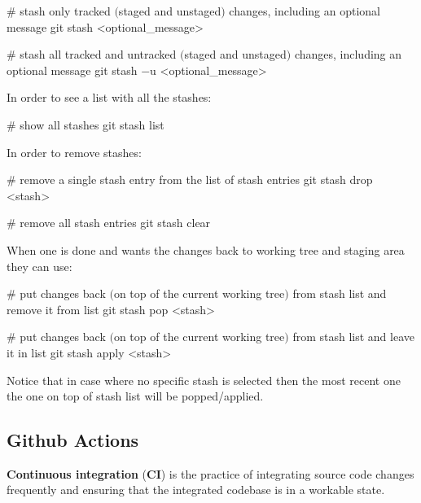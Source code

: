 \begin{bash}
# stash only tracked $($staged and unstaged$)$ changes, including an optional message
git stash <optional_message>
\end{bash}

\begin{bash}
# stash all tracked and untracked $($staged and unstaged$)$ changes, including an optional message
git stash $-$u <optional_message>
\end{bash}

In order to see a list with all the stashes:

\begin{bash}
# show all stashes
git stash list
\end{bash}

In order to remove stashes:

\begin{bash}
# remove a single stash entry from the list of stash entries
git stash drop <stash>
\end{bash}

\begin{bash}
# remove all stash entries
git stash clear
\end{bash}

When one is done and wants the changes back to working tree and staging area they can use:

\begin{bash}
# put changes back $($on top of the current working tree$)$ from stash list and remove it from list
git stash pop <stash>
\end{bash}

\begin{bash}
# put changes back $($on top of the current working tree$)$ from stash list and leave it in list
git stash apply <stash>
\end{bash}

Notice that in case where no specific stash is selected then the most recent one the one on top of stash list will be
popped/applied.

\subsection{Github Actions}

\textbf{Continuous integration} (\textbf{CI}) is the practice of integrating source code changes frequently and ensuring
that the integrated codebase is in a workable state.
\ed

